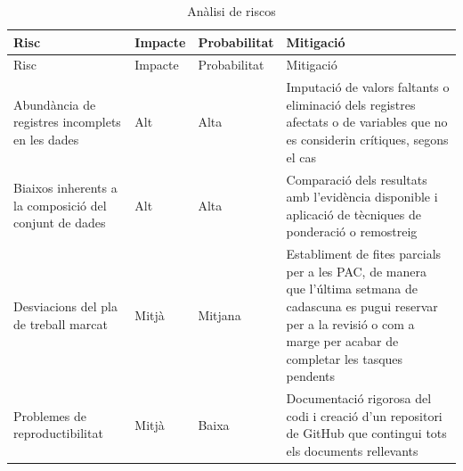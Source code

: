 \documentclass[CAT]{TFUOC}%
\begin{document}
\begin{longtable}[]{@{}
  >{\raggedright\arraybackslash}p{}
  >{\raggedright\arraybackslash}p{}
  >{\raggedright\arraybackslash}p{}
  >{\raggedright\arraybackslash}p{}@{}}
\caption{Anàlisi de riscos}\label{tab:taula1-3}\tabularnewline
\toprule\noalign{}
\begin{minipage}[b]{\linewidth}\raggedright
Risc
\end{minipage} & \begin{minipage}[b]{\linewidth}\raggedright
Impacte
\end{minipage} & \begin{minipage}[b]{\linewidth}\raggedright
Probabilitat
\end{minipage} & \begin{minipage}[b]{\linewidth}\raggedright
Mitigació
\end{minipage} \\
\midrule\noalign{}
\endfirsthead
\toprule\noalign{}
\begin{minipage}[b]{\linewidth}\raggedright
Risc
\end{minipage} & \begin{minipage}[b]{\linewidth}\raggedright
Impacte
\end{minipage} & \begin{minipage}[b]{\linewidth}\raggedright
Probabilitat
\end{minipage} & \begin{minipage}[b]{\linewidth}\raggedright
Mitigació
\end{minipage} \\
\midrule\noalign{}
\endhead
\bottomrule\noalign{}
\endlastfoot
Abundància de registres incomplets en les dades & Alt & Alta & Imputació de valors faltants o eliminació dels registres afectats o de variables que no es considerin crítiques, segons el cas \\
Biaixos inherents a la composició del conjunt de dades & Alt & Alta & Comparació dels resultats amb l'evidència disponible i aplicació de tècniques de ponderació o remostreig \\
Desviacions del pla de treball marcat & Mitjà & Mitjana & Establiment de fites parcials per a les PAC, de manera que l'última setmana de cadascuna es pugui reservar per a la revisió o com a marge per acabar de completar les tasques pendents \\
Problemes de reproductibilitat & Mitjà & Baixa & Documentació rigorosa del codi i creació d'un repositori de GitHub que contingui tots els documents rellevants \\
\end{longtable}
\end{document}
